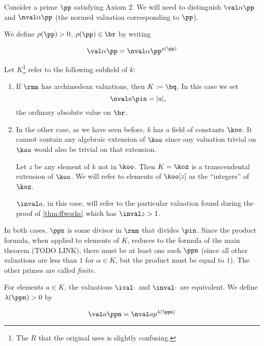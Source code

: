 Consider a prime $\pp$ satisfying Axiom 2. We will need to distinguish $\val
\alpha \pp$ and $\nval \alpha \pp$ (the normed valuation corresponding to
$\pp$).

We define $\rho(\pp) > 0$, $\rho(\pp) \in \br$ by writing

\[ \val \alpha \pp = \nval \alpha \pp ^{\rho(\pp)} \]

Let $K$\footnote{The $R$ that the original uses is slightly confusing.} refer to
the following subfield of $k$:

\begin{enumerate}
\item If $\rmm$ has archimedean valuations, then $K := \bq$. In this case we set
  \[ \nval a \pin = |a|, \]
  the ordinary absolute value on $\br$.

\item In the other case, as we have seen before, $k$ has a field of constants
  $\koo$. It cannot contain any algebraic extension of $\koo$ since any
  valuation trivial on $\koo$ would also be trivial on that extension.

  Let $z$ be any element of $k$ not in $\koo$. Then $K = \koz$ is a
  transcendental extension of $\koo$. We will refer to elements of $\koo[z]$ as
  the ``integers'' of $\koz$.

  $\inval a$, in this case, will refer to the particular valuation found during
  the proof of \ref{thm:ffworks} which has $\inval z > 1$.
\end{enumerate}

In both cases, $\ppn$ is some divisor in $\rmm$ that divides $\pin$. Since the
product formula, when applied to elements of $K$, reduces to the formula of the
main theorem (TODO LINK), there must be at least one such $\ppn$ (since all
other valuations are less than $1$ for $\alpha\in K$, but the product must be
equal to $1$). The other primes are called \textit{finite}.

For elements $a\in K$, the valuations $\ival\cdot$ and $\inval\cdot$ are
equivalent. We define $\lambda(\ppn) > 0$ by

\[ \val a \ppn = \nval a p ^{\lambda(\ppn)} \]

